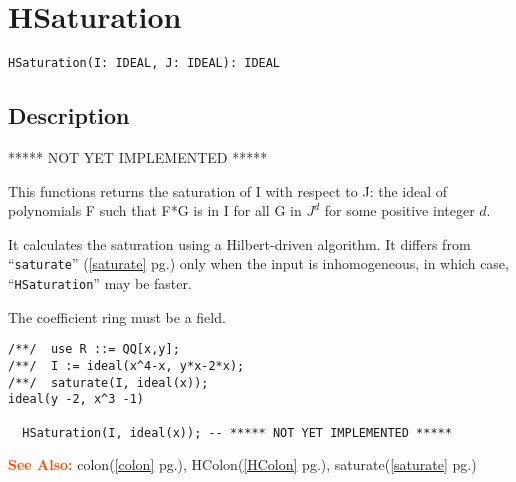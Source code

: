 \documentclass[a4paper]{mybook}
\newenvironment{command}{}{} %
\newcommand\SeeAlso{\par\textcolor{OrangeRed}{\textbf{\large See Also: }}}
\begin{document}
\section{HSaturation}
\label{HSaturation}
\begin{command} %


\begin{Verbatim}[label=syntax, rulecolor=\color{MidnightBlue},
frame=single]
HSaturation(I: IDEAL, J: IDEAL): IDEAL
\end{Verbatim}


\subsection*{Description}

***** NOT YET IMPLEMENTED *****
\par 
This functions returns the saturation of I with respect to J: the
ideal of polynomials F such that F*G is in I for all G in $J^d$
for some positive integer $d$.
\par 
It calculates the saturation using a Hilbert-driven algorithm.
It differs from ``\verb&saturate&'' (\ref{saturate} pg.\pageref{saturate}) only when the
input is inhomogeneous, in which case, ``\verb&HSaturation&'' may be faster.
\par 
The coefficient ring must be a field.
\begin{Verbatim}[label=example, rulecolor=\color{PineGreen}, frame=single]
/**/  use R ::= QQ[x,y];
/**/  I := ideal(x^4-x, y*x-2*x);
/**/  saturate(I, ideal(x));
ideal(y -2, x^3 -1)

  HSaturation(I, ideal(x)); -- ***** NOT YET IMPLEMENTED *****
\end{Verbatim}


\SeeAlso %
  colon(\ref{colon} pg.\pageref{colon}), 
    HColon(\ref{HColon} pg.\pageref{HColon}), 
    saturate(\ref{saturate} pg.\pageref{saturate})
\end{command} %
\end{document}
